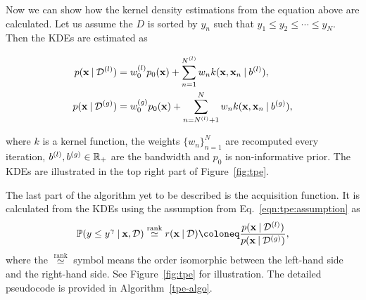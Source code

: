 Now we can show how the kernel density estimations from the equation above are calculated. Let us assume the $D$ is sorted by $y_n$ such that $y_1 \leq y_2 \leq \cdots \leq y_N$. Then the KDEs are estimated as


\begin{equation}
    \begin{split}
   p(\mathbf{x} \:\vert\: \mathcal{D}^{(l)}) &= w_0^{(l)} p_0(\mathbf{x}) + \sum_{n=1}^{N^{(l)}}w_n k(\mathbf{x},\mathbf{x}_n \:\vert\: b^{(l)}), \\
   p(\mathbf{x} \:\vert\: \mathcal{D}^{(g)}) &= w_0^{(g)} p_0(\mathbf{x}) + \sum_{n=N^{(l)}+1}^{N}w_n k(\mathbf{x},\mathbf{x}_n \:\vert\: b^{(g)}),
    \end{split}
    \label{eqn:tpe:kdes}
\end{equation}

where $k$ is a kernel function, the weights $\{ w_n \}_{n=1}^N$ are recomputed every iteration, $b^{(l)},b^{(g)} \in \mathbb{R}_+$ are the bandwidth and $p_0$ is non-informative prior. The KDEs are illustrated in the top right part of Figure~\ref{fig:tpe}.

The last part of the algorithm yet to be described is the acquisition function. It is calculated from the KDEs using the assumption from Eq.~\ref{eqn:tpe:assumption} as
\[
\mathbb{P}(y \leq y^\gamma \given \mathbf{x},\mathcal{D}) \overset{\text{rank}}{\simeq} r(\mathbf{x} \given \mathcal{D}) \coloneq  \frac{p(\mathbf{x} \given \mathcal{D}^{(l)})}{p(\mathbf{x} \given \mathcal{D}^{(g)})} ,
\]
where the $\overset{\text{rank}}{\simeq}$ symbol means the order isomorphic between the left-hand side and the right-hand side. See Figure~\ref{fig:tpe} for illustration. The detailed pseudocode is provided in Algorithm~\ref{tpe-algo}.




